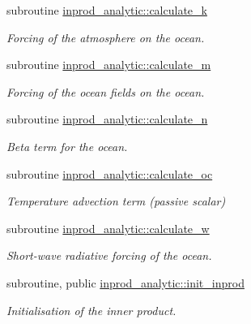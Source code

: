 \begin{DoxyCompactItemize}
subroutine \hyperlink{namespaceinprod__analytic_acb883b9fbefbca46b83b384ee74ed703}{inprod\+\_\+analytic\+::calculate\+\_\+k}
\begin{DoxyCompactList}\small\item\em Forcing of the atmosphere on the ocean. \end{DoxyCompactList}\item 
subroutine \hyperlink{namespaceinprod__analytic_ad89fa4b40a4f55e72942f09427d2bafd}{inprod\+\_\+analytic\+::calculate\+\_\+m}
\begin{DoxyCompactList}\small\item\em Forcing of the ocean fields on the ocean. \end{DoxyCompactList}\item 
subroutine \hyperlink{namespaceinprod__analytic_a76eeb8a6a44af38e397edd7e0617afca}{inprod\+\_\+analytic\+::calculate\+\_\+n}
\begin{DoxyCompactList}\small\item\em Beta term for the ocean. \end{DoxyCompactList}\item 
subroutine \hyperlink{namespaceinprod__analytic_a189dc06ce5a20fe4f4c99ce982544f1c}{inprod\+\_\+analytic\+::calculate\+\_\+oc}
\begin{DoxyCompactList}\small\item\em Temperature advection term (passive scalar) \end{DoxyCompactList}\item 
subroutine \hyperlink{namespaceinprod__analytic_ad275ee27fa04491805aa7a648183a754}{inprod\+\_\+analytic\+::calculate\+\_\+w}
\begin{DoxyCompactList}\small\item\em Short-\/wave radiative forcing of the ocean. \end{DoxyCompactList}\item 
subroutine, public \hyperlink{namespaceinprod__analytic_a15216aea8062cfef76196c8453a4291c}{inprod\+\_\+analytic\+::init\+\_\+inprod}
\begin{DoxyCompactList}\small\item\em Initialisation of the inner product. \end{DoxyCompactList}\end{DoxyCompactItemize}
